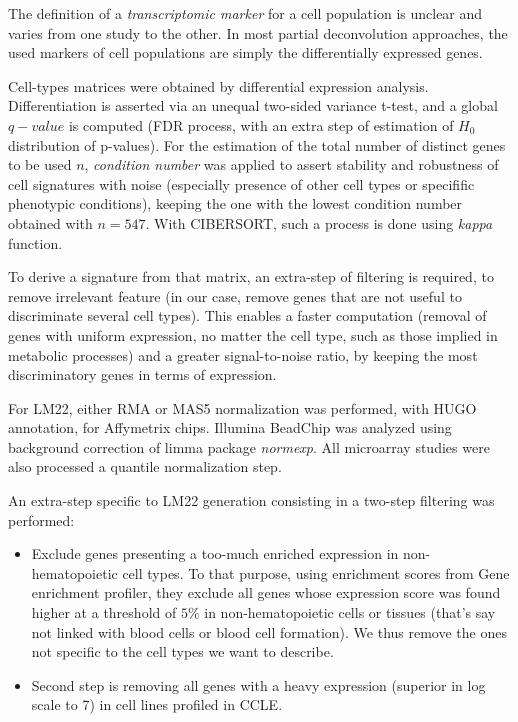 
The definition of a \emph{transcriptomic marker} for a cell population
is unclear and varies from one study to the other. In most partial
deconvolution approaches, the used markers of cell populations are
simply the differentially expressed genes.

Cell-types matrices were obtained by differential expression analysis.
Differentiation is asserted via an unequal two-sided variance t-test,
and a global \(q-value\) is computed (FDR process, with an extra step of
estimation of \(H_0\) distribution of p-values). For the estimation of
the total number of distinct genes to be used \(n\), \emph{condition
number} was applied to assert stability and robustness of cell
signatures with noise (especially presence of other cell types or
specifific phenotypic conditions), keeping the one with the lowest
condition number obtained with \(n=547\). With CIBERSORT, such a process
is done using \emph{kappa} function.

To derive a signature from that matrix, an extra-step of filtering is
required, to remove irrelevant feature (in our case, remove genes that
are not useful to discriminate several cell types). This enables a
faster computation (removal of genes with uniform expression, no matter
the cell type, such as those implied in metabolic processes) and a
greater signal-to-noise ratio, by keeping the most discriminatory genes
in terms of expression.

For LM22, either RMA or MAS5 normalization was performed, with HUGO
annotation, for Affymetrix chips. Illumina BeadChip was analyzed using
background correction of limma package \emph{normexp}. All microarray
studies were also processed a quantile normalization step.

An extra-step specific to LM22 generation consisting in a two-step
filtering was performed:

\begin{itemize}
\item
  Exclude genes presenting a too-much enriched expression in
  non-hematopoietic cell types. To that purpose, using enrichment scores
  from Gene enrichment profiler, they exclude all genes whose expression
  score was found higher at a threshold of \(5\%\) in non-hematopoietic
  cells or tissues (that's say not linked with blood cells or blood cell
  formation). We thus remove the ones not specific to the cell types we
  want to describe.
\item
  Second step is removing all genes with a heavy expression (superior in
  log scale to 7) in cell lines profiled in CCLE.
\end{itemize}


